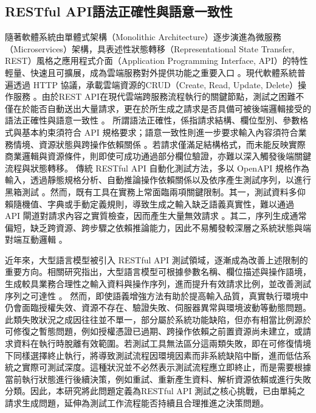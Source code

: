 \begin{ZhChapter}
\section{RESTful API語法正確性與語意一致性}
\text 隨著軟體系統由單體式架構（Monolithic Architecture）逐步演進為微服務（Microservices）架構，具表述性狀態轉移（Representational State Transfer, REST）風格之應用程式介面（Application Programming Interface, API）的特性輕量、快速且可擴展，成為雲端服務對外提供功能之重要入口 \parencite{Kim2025LlamaRestTest, Zheng2024RESTLess}。現代軟體系統普遍透過 HTTP 協議，承載雲端資源的CRUD（Create, Read, Update, Delete）操作服務 \parencite{Nguyen2024KAT}。由於REST API在現代雲端跨服務流程執行的關鍵節點，測試之困難不僅在於能否自動送出大量請求，更在於所生成之請求是否具備可被後端邏輯接受的語法正確性與語意一致性 \parencite{Wang2020AutomaticGeneration}。
\text 所謂語法正確性，係指請求結構、欄位型別、參數格式與基本約束須符合 API 規格要求；語意一致性則進一步要求輸入內容須符合業務情境、資源狀態與跨操作依賴關係 \parencite{Zheng2024RESTLess, Alonso2023ARTE}。若請求僅滿足結構格式，而未能反映實際商業邏輯與資源條件，則即使可成功通過部分欄位驗證，亦難以深入觸發後端關鍵流程與狀態轉移。
\text 傳統 RESTful API 自動化測試方法，多以 OpenAPI 規格作為輸入，透過靜態規格分析、自動推論操作依賴關係以及依序產生測試序列，以進行黑箱測試 \parencite{Alonso2023ARTE, Arcuri2021Automated, Wang2020AutomaticGeneration}。然而，既有工具在實務上常面臨兩項關鍵限制。其一，測試資料多仰賴隨機值、字典或手動定義規則，導致生成之輸入缺乏語義真實性，難以通過 API 閘道對請求內容之實質檢查，因而產生大量無效請求 \parencite{Zheng2024RESTLess, Alonso2023ARTE}。其二，序列生成通常偏短，缺乏跨資源、跨步驟之依賴推論能力，因此不易觸發較深層之系統狀態與端對端互動邏輯 \parencite{Atlidakis2019RESTler, Viglianisi2020RESTTESTGEN, Corradini2022RestTestGen}。

\text 近年來，大型語言模型被引入 RESTful API 測試領域，逐漸成為改善上述限制的重要方向。相關研究指出，大型語言模型可根據參數名稱、欄位描述與操作語境，生成較具業務合理性之輸入資料與操作序列，進而提升有效請求比例，並改善測試序列之可達性 \parencite{Zheng2024RESTLess, Nguyen2024KAT}。
\text 然而，即使語義增強方法有助於提高輸入品質，真實執行環境中仍會面臨授權失效、資源不存在、驗證失敗、伺服器異常與環境波動等動態問題。此類失敗狀況之成因往往並不單一，部分屬於系統功能缺陷，但亦有相當比例源於可修復之暫態問題，例如授權憑證已過期、跨操作依賴之前置資源尚未建立，或請求資料在執行時脫離有效範圍。若測試工具無法區分這兩類失敗，即在可修復情境下同樣選擇終止執行，將導致測試流程因環境因素而非系統缺陷中斷，進而低估系統之實際可測試深度。這種狀況並不必然表示測試流程應立即終止，而是需要根據當前執行狀態進行後續決策，例如重試、重新產生資料、解析資源依賴或進行失敗分類。因此，本研究將此問題定義為RESTful API 測試之核心挑戰，已由單純之請求生成問題，延伸為測試工作流程能否持續且合理推進之決策問題。


\end{ZhChapter}
